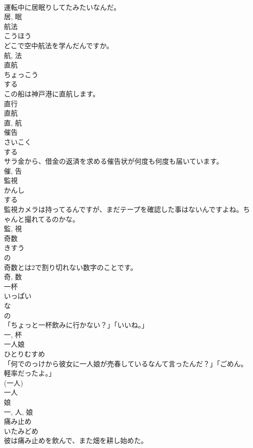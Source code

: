 \documentclass[8pt]{extreport}
\begin{document}
\begin{CJK}{UTF8}{min}
\\	運転中に居眠りしてたみたいなんだ。	
\\	居, 眠	
\\	航法	
\\	こうほう	
\\	どこで空中航法を学んだんですか。	
\\	航, 法	
\\	直航	
\\	ちょっこう	
\\	する 
\\	この船は神戸港に直航します。	
\\	直行 
\\	直航 
\\	直, 航	
\\	催告	
\\	さいこく	
\\	する 
\\	サラ金から、借金の返済を求める催告状が何度も何度も届いています。	
\\	催, 告	
\\	監視	
\\	かんし	
\\	する 
\\	監視カメラは持ってるんですが、まだテープを確認した事はないんですよね。ちゃんと撮れてるのかな。	
\\	監, 視	
\\	奇数	
\\	きすう	
\\	の 
\\	奇数とは2で割り切れない数字のことです。	
\\	奇, 数	
\\	一杯	
\\	いっぱい	
\\	な 
\\	の 
\\	「ちょっと一杯飲みに行かない？」「いいね。」	
\\	一, 杯	
\\	一人娘	
\\	ひとりむすめ	
\\	「何でのっけから彼女に一人娘が売春しているなんて言ったんだ？」「ごめん。軽率だったよ。」	
\\	(一人) 
\\	一人 
\\	娘 
\\	一, 人, 娘	
\\	痛み止め	
\\	いたみどめ	
\\	彼は痛み止めを飲んで、また畑を耕し始めた。	

\end{CJK}
\end{document}
